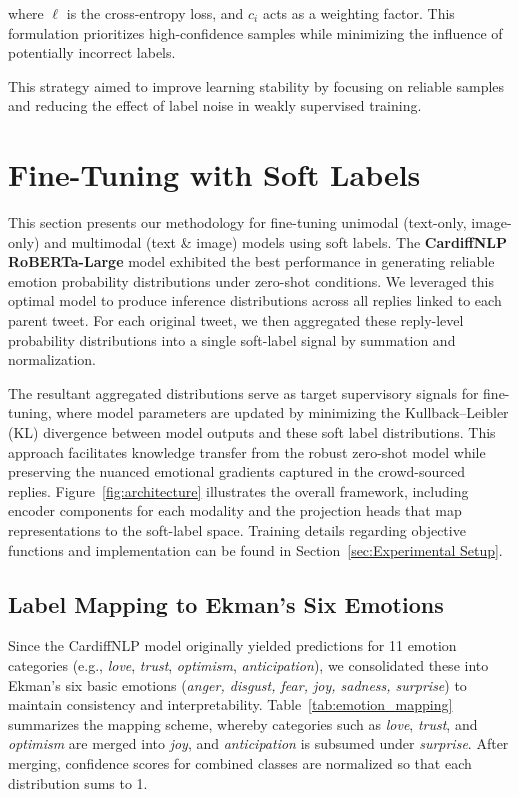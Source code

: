 where $\ell$ is the cross-entropy loss, and $c_i$ acts as a weighting factor. This formulation prioritizes high-confidence samples while minimizing the influence of potentially incorrect labels.  

This strategy aimed to improve learning stability by focusing on reliable samples and reducing the effect of label noise in weakly supervised training.


\section{Fine-Tuning with Soft Labels}
\label{sec:finetuning}

This section presents our methodology for fine-tuning unimodal (text-only, image-only) and multimodal (text \& image) models using soft labels. The \textbf{CardiffNLP RoBERTa-Large} model exhibited the best performance in generating reliable emotion probability distributions under zero-shot conditions. We leveraged this optimal model to produce inference distributions across all replies linked to each parent tweet. For each original tweet, we then aggregated these reply-level probability distributions into a single soft-label signal by summation and normalization.
\newline

The resultant aggregated distributions serve as target supervisory signals for fine-tuning, where model parameters are updated by minimizing the Kullback–Leibler (KL) divergence between model outputs and these soft label distributions. This approach facilitates knowledge transfer from the robust zero-shot model while preserving the nuanced emotional gradients captured in the crowd-sourced replies. Figure~\ref{fig:architecture} illustrates the overall framework, including encoder components for each modality and the projection heads that map representations to the soft-label space. Training details regarding objective functions and implementation can be found in Section~\ref{sec:Experimental Setup}.

\subsection{Label Mapping to Ekman’s Six Emotions}
Since the CardiffNLP model originally yielded predictions for 11 emotion categories (e.g., \emph{love}, \emph{trust}, \emph{optimism}, \emph{anticipation}), we consolidated these into Ekman’s six basic emotions (\emph{anger, disgust, fear, joy, sadness, surprise}) to maintain consistency and interpretability. Table~\ref{tab:emotion_mapping} summarizes the mapping scheme, whereby categories such as \emph{love}, \emph{trust}, and \emph{optimism} are merged into \emph{joy}, and \emph{anticipation} is subsumed under \emph{surprise}. After merging, confidence scores for combined classes are normalized so that each distribution sums to 1.

